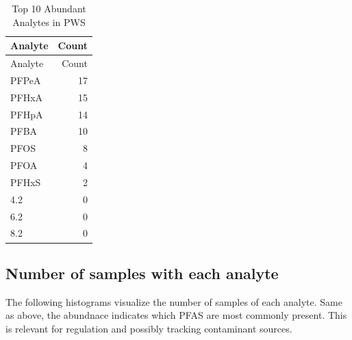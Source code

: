 \documentclass[
  12pt,
]{article}
\begin{document}
\begin{longtable}[]{@{}lr@{}}
\caption{Top 10 Abundant Analytes in PWS}\tabularnewline
\toprule
Analyte & Count\tabularnewline
\midrule
\endfirsthead
\toprule
Analyte & Count\tabularnewline
\midrule
\endhead
PFPeA & 17\tabularnewline
PFHxA & 15\tabularnewline
PFHpA & 14\tabularnewline
PFBA & 10\tabularnewline
PFOS & 8\tabularnewline
PFOA & 4\tabularnewline
PFHxS & 2\tabularnewline
4.2 & 0\tabularnewline
6.2 & 0\tabularnewline
8.2 & 0\tabularnewline
\bottomrule
\end{longtable}

\hypertarget{number-of-samples-with-each-analyte}{%
\subsection{Number of samples with each
analyte}\label{number-of-samples-with-each-analyte}}

The following histograms visualize the number of samples of each
analyte. Same as above, the abundnace indicates which PFAS are most
commonly present. This is relevant for regulation and possibly tracking
contaminant sources.
\end{document}

